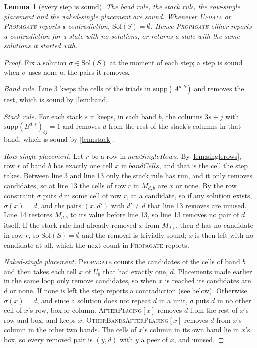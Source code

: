 \documentclass[11pt]{article}
\newtheorem{lemma}[theorem]{Lemma}
\theoremstyle{definition}
\theoremstyle{plain}
\let\origtextsc\textsc
\renewcommand{\textsc}[1]{\textup{\origtextsc{#1}}}
\begin{document}
\begin{lemma}[every step is sound]
\label{lem:steps}
The band rule, the stack rule, the row-single placement and the naked-single placement are sound. Whenever
\textsc{Update} or \textsc{Propagate} reports a contradiction, $\mathrm{Sol}(S)=\emptyset$. Hence \textsc{Propagate}
either reports a contradiction for a state with no solutions, or returns a state with the same solutions it started
with.
\end{lemma}
\begin{proof}
Fix a solution $\sigma\in\mathrm{Sol}(S)$ at the moment of each step; a step is sound when $\sigma$ uses none of the
pairs it removes.

\emph{Band rule.} Line 3 keeps the cells of the triads in $\mathrm{supp}(A^{d,b})$ and removes the rest, which is sound
by \cref{lem:band}.

\emph{Stack rule.} For each stack $s$ it keeps, in each band $b$, the columns $3s+j$ with $\mathrm{supp}(B^{d,s})_{bj}=1$
and removes $d$ from the rest of the stack's columns in that band, which is sound by \cref{lem:stack}.

\emph{Row-single placement.} Let $r$ be a row in $\mathit{newSingleRows}$. By \cref{lem:singlerows}, row $r$ of band
$b$ has exactly one cell $x$ in $\mathit{bandCells}$, and that is the cell the step takes. Between line 3 and line 13
only the stack rule has run, and it only removes candidates, so at line 13 the cells of row $r$ in $M_{d,b}$ are $x$
or none. By the row constraint $\sigma$ puts $d$ in some cell of row $r$, at a candidate, so if any solution exists,
$\sigma(x)=d$, and the pairs $(x,d')$ with $d'\neq d$ that line 13 removes are unused. Line 14 restores $M_{d,b}$ to
its value before line 13, so line 13 removes no pair of $d$ itself. If the stack rule had already removed $x$ from
$M_{d,b}$, then $d$ has no candidate in row $r$, so $\mathrm{Sol}(S)=\emptyset$ and the removal is trivially sound;
$x$ is then left with no candidate at all, which the next count in \textsc{Propagate} reports.

\emph{Naked-single placement.} \textsc{Propagate} counts the candidates of the cells of band $b$ and then takes each
cell $x$ of $U_b$ that had exactly one, $d$. Placements made earlier in the same loop only remove candidates, so when
$x$ is reached its candidates are $d$ or none. If none is left the step reports a contradiction (see below).
Otherwise $\sigma(x)=d$, and since a solution does not repeat $d$ in a unit, $\sigma$ puts $d$ in no other cell of
$x$'s row, box or column. \textsc{AfterPlacing}$[x]$ removes $d$ from the rest of $x$'s row and box, and keeps $x$;
\textsc{OtherBandsAfterPlacing}$[x]$ removes $d$ from $x$'s column in the other two bands. The cells of $x$'s column
in its own band lie in $x$'s box, so every removed pair is $(y,d)$ with $y$ a peer of $x$, and unused.


\end{proof}
\end{document}
